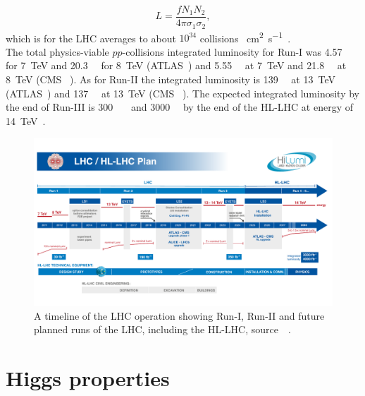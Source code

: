 \begin{equation}
	L = \frac{f N_1 N_2}{4 \pi  \sigma_1 \sigma_2},
\end{equation}
which is for the LHC averages to about $ 10^{34}$ collisions \si{\per \centi\metre\squared \per \second}~\cite{closer,lhcpreformance}.  \\ The total physics-viable $pp$-collisions  integrated luminosity for Run-I was \SI{4.57}{\per \femtobarn} for \SI{7}{\tera\electronvolt} and \SI{20.3}{\per \femtobarn} for \SI{8}{\tera\electronvolt} (ATLAS~\cite{atlaslumi1}) and  \SI{5.55}{\per \femtobarn} at \SI{7}{\tera\electronvolt} and \SI{21.8}{\per \femtobarn} at \SI{8}{\tera\electronvolt} (CMS ~\cite{cmslumi}). As for Run-II the integrated luminosity is \SI{139}{\per \femtobarn} at \SI{13}{\tera\electronvolt } (ATLAS~\cite{atlaslumi2})  and \SI{137}{\per \femtobarn} at \SI{13}{\tera\electronvolt } (CMS ~\cite{cmslumi}). The expected integrated luminosity by the end of Run-III is  \SI{300}{\per \femtobarn}~\cite{Fartoukh:2790409} and \SI{3000}{\per \femtobarn} by the end of the HL-LHC at energy of \SI{14}{\tera\electronvolt }~\cite{Apollinari:2015bam}. 
\begin{figure}
	\centering
		\includegraphics[width=\textwidth]{figures/HL-LHC-plan-2021-1}
	\caption{ A timeline of the LHC operation showing Run-I, Run-II and future planned runs of the LHC, including the HL-LHC, source~~\cite{lhckomission}. 
	}
\label{fig:lhcplan}
\end{figure}
\FloatBarrier
\section{Higgs properties \label{sec:Higgsprop} }
